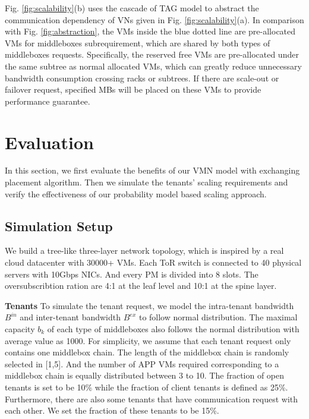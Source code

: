 \documentclass[review]{elsarticle}
\begin{document}
Fig. \ref{fig:scalability}(b) uses the cascade of TAG model to abstract the communication dependency of VNs given in Fig. \ref{fig:scalability}(a). In comparison with Fig. \ref{fig:abstraction}, the VMs inside the blue dotted line are pre-allocated VMs for middleboxes subrequirement, which are shared by both types of middleboxes requests.
Specifically, the reserved free VMs are pre-allocated under the same subtree as normal allocated VMs, which can greatly reduce unnecessary  bandwidth consumption crossing racks or subtrees. If there are scale-out or failover request, specified MBs will be placed on these VMs to provide performance guarantee. %




\section{Evaluation}\label{sec:simulation}

In this section, we first evaluate the benefits of our VMN model with exchanging placement algorithm. Then we simulate the tenants' scaling requirements and verify the effectiveness of our probability model based scaling approach.





\subsection{Simulation Setup}
We build a tree-like three-layer network topology, which is inspired by a real cloud datacenter with 30000+ VMs. Each ToR switch is connected to 40 physical servers with 10Gbps NICs. And every PM is divided into 8 slots. The oversubscribtion ration are 4:1 at the leaf level and 10:1 at the spine layer.  

\textbf{Tenants} To simulate the tenant request, we model the intra-tenant bandwidth $B^{in}$ and inter-tenant bandwidth $B^{ex}$ to follow normal distribution. The maximal capacity $b_k$ of each type of middleboxes also follows the normal distribution with average value as 1000. For simplicity, we assume that each tenant request only contains one middlebox chain. The length of the middlebox chain is randomly selected in [1,5]. And the number of APP VMs required corresponding to a middlebox chain is equally distributed between 3 to 10. The fraction of open tenants is set to be 10\% while the fraction of client tenants is defined as 25\%. Furthermore, there are also some tenants that have communication request with each other. We set the fraction of these tenants to be 15\%.  
\end{document}
